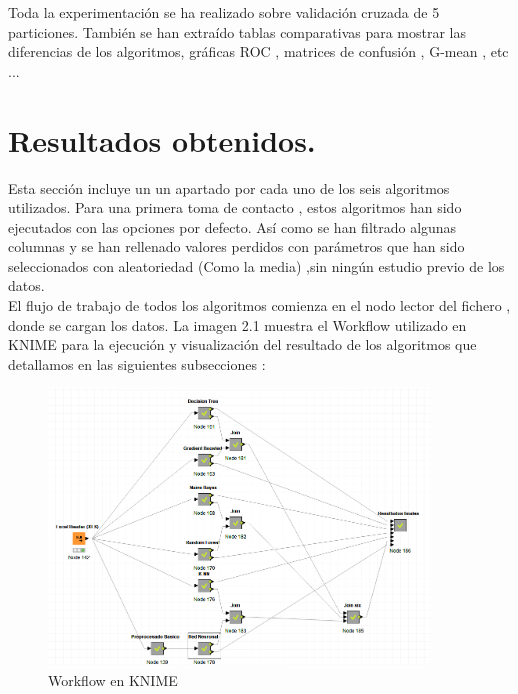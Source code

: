 	Toda la experimentación se ha realizado sobre validación cruzada de 5 particiones. También se han extraído tablas comparativas para mostrar
	las diferencias de los algoritmos, gráficas ROC , matrices de confusión , G-mean , etc ...

	
	\section[Resultados obtenidos]{Resultados obtenidos.}

	Esta sección incluye un un apartado por cada uno de los seis algoritmos utilizados. 
	Para una primera toma de contacto , estos algoritmos han sido ejecutados con las opciones por defecto.
	Así como se han filtrado algunas columnas y se han rellenado valores perdidos con parámetros que han sido seleccionados 
	con aleatoriedad (Como la media) ,sin ningún estudio previo de los datos. \\

	El flujo de trabajo de todos los algoritmos comienza en el nodo lector del fichero , donde se cargan los datos. La 
	imagen 2.1 muestra el Workflow utilizado en KNIME para la ejecución y visualización del resultado de los algoritmos que detallamos en las siguientes subsecciones :

	\begin{figure}[htb]
		\centering
		\includegraphics[width=0.9\textwidth]{./imagenes/33}
		\caption{Workflow en KNIME} \label{fig:33}
	\end{figure}


